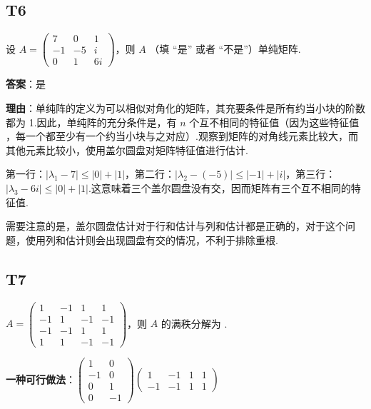 \documentclass{article}
\begin{document}
\subsection{T6}

\par 设 $A=\begin{pmatrix}
	7 & 0 & 1\\
	-1 & -5 & i\\
	0 & 1 & 6i
\end{pmatrix}$，则 $A$ \underline{\phantom{empty\_space}}（填 “是” 或者 “不是”）单纯矩阵.

\par \textbf{答案}：是

\par \textbf{理由}：单纯阵的定义为可以相似对角化的矩阵，其充要条件是所有约当小块的阶数都为 1.因此，单纯阵的充分条件是，有 $n$ 个互不相同的特征值（因为这些特征值 ，每一个都至少有一个约当小块与之对应）.观察到矩阵的对角线元素比较大，而其他元素比较小，使用盖尔圆盘对矩阵特征值进行估计.

第一行：$|\lambda_1-7|\leq |0| + |1|$，第二行：$|\lambda_2-(-5)|\leq |-1| + |i|$，第三行：$|\lambda_3-6i|\leq |0| + |1|$.这意味着三个盖尔圆盘没有交，因而矩阵有三个互不相同的特征值.

需要注意的是，盖尔圆盘估计对于行和估计与列和估计都是正确的，对于这个问题，使用列和估计则会出现圆盘有交的情况，不利于排除重根.

\subsection{T7}

\par $A=\begin{pmatrix}
	1 & -1 & 1 & 1\\
	-1 & 1 & -1 & -1\\
	-1 & -1 & 1 & 1\\
	1 & 1 & -1 & -1
\end{pmatrix}$，则 $A$ 的满秩分解为 \underline{\phantom{empty\_space}}.

\par \textbf{一种可行做法}：$\begin{pmatrix}
	1 & 0\\
	-1 & 0\\
	0 & 1\\
	0 & -1
\end{pmatrix} \begin{pmatrix}
	1 & -1 & 1 & 1\\
	-1 & -1 & 1 & 1
\end{pmatrix}$
\end{document}
